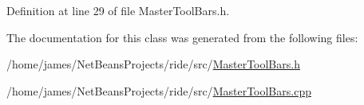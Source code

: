 Definition at line 29 of file Master\-Tool\-Bars.\-h.



The documentation for this class was generated from the following files\-:\begin{DoxyCompactItemize}
\item 
/home/james/\-Net\-Beans\-Projects/ride/src/\hyperlink{_master_tool_bars_8h}{Master\-Tool\-Bars.\-h}\item 
/home/james/\-Net\-Beans\-Projects/ride/src/\hyperlink{_master_tool_bars_8cpp}{Master\-Tool\-Bars.\-cpp}\end{DoxyCompactItemize}
